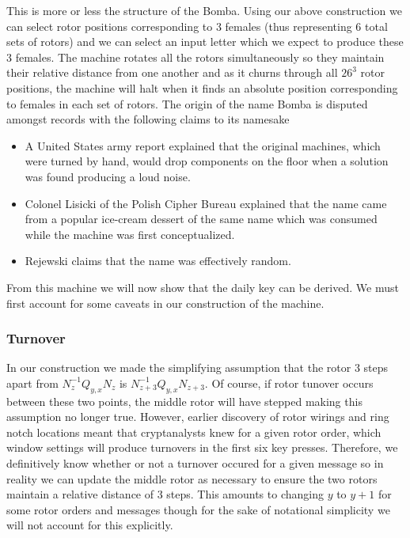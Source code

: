\noindent This is more or less the structure of the Bomba. Using our
above construction we can select rotor positions corresponding to 3
females (thus representing 6 total sets of rotors) and we can select
an input letter which we expect to produce these 3 females. The
machine rotates all the rotors simultaneously so they maintain their
relative distance from one another and as it churns through all
$26^3$ rotor positions, the machine will halt when it finds an
absolute position corresponding to females in each set of rotors. The
origin of the name Bomba is disputed amongst records with the
following claims to its namesake
\begin{itemize}
	\item A United States army report explained that the original
	      machines, which were turned by hand, would drop components on the
	      floor when a solution was found producing a loud noise.
	\item Colonel Lisicki of the Polish Cipher Bureau explained that
	      the name came from a popular ice-cream dessert of the same name
	      which was consumed while the machine was first conceptualized.
	\item Rejewski claims that the name was effectively random.
\end{itemize}
From this machine we will now show that the daily key can be derived.
We must first account for some caveats in our construction of the machine.

\subsubsection{Turnover}
In our construction we made the simplifying assumption that the rotor
3 steps apart from $N_{z}^{-1}Q_{y,x}N_{z}$ is
$N_{z+3}^{-1}Q_{y,x}N_{z+3}$. Of course, if rotor tunover occurs
between these two points, the middle rotor will have stepped making
this assumption no longer true. However, earlier discovery of rotor
wirings and ring notch locations meant that cryptanalysts knew for a
given rotor order, which window settings will produce turnovers in
the first six key presses. Therefore, we definitively know whether or
not a turnover occured for a given message so in reality we can
update the middle rotor as necessary to ensure the two rotors
maintain a relative distance of 3 steps. This amounts to changing $y$
to $y+1$ for some rotor orders and messages though for the sake of
notational simplicity we will not account for this explicitly.
